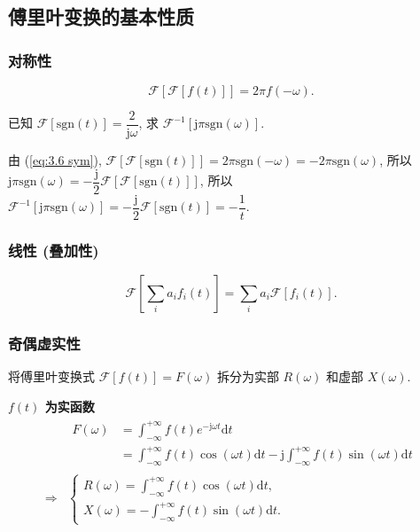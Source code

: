 \subsection{傅里叶变换的基本性质} \label{3 傅里叶变换的基本性质}
\subsubsection{对称性}
\rmg
\begin{equation} \label{eq:3.6 sym}
    \mathcal{F}[\mathcal{F}[f(t)]]=2\pi f(-\omega).
\end{equation}

\begin{exampleprob}
    已知 $\mathcal{F}[\mathrm{sgn}(t)]=\dfrac{2}{\mathrm{j}\omega}$, 求 $\mathcal{F}^{-1}[\mathrm{j}\pi\mathrm{sgn}(\omega)]$.

    \begin{solution}
        由 (\ref{eq:3.6 sym}), $\mathcal{F}[\mathcal{F}[\mathrm{sgn}(t)]]=2\pi\mathrm{sgn}(-\omega)=-2\pi\mathrm{sgn}(\omega)$, 所以 $\mathrm{j}\pi\mathrm{sgn}(\omega)=-\dfrac{\mathrm{j}}{2}\mathcal{F}[\mathcal{F}[\mathrm{sgn}(t)]]$, 所以\newline $\mathcal{F}^{-1}[\mathrm{j}\pi\mathrm{sgn}(\omega)]=-\dfrac{\mathrm{j}}{2}\mathcal{F}[\mathrm{sgn}(t)]=-\dfrac{1}{t}$.
    \end{solution}
\end{exampleprob}

\subsubsection{线性 (叠加性)}
\srmg
\begin{equation}
    \mathcal{F}\left[\sum_{i}a_if_i(t)\right]=\sum_{i}a_i\mathcal{F}[f_i(t)].
\end{equation}

\subsubsection{奇偶虚实性}
将傅里叶变换式 $\mathcal{F}[f(t)]=F(\omega)$ 拆分为实部 $R(\omega)$ 和虚部 $X(\omega)$.

\textbf{$f(t)$ 为实函数}
\begin{align}
    \nonumber   & \begin{aligned}
                      F(\omega) & =\int_{-\infty}^{+\infty}f(t)e^{-\mathrm{j}\omega t}\mathrm{d}t                                                        \\
                                & =\int_{-\infty}^{+\infty}f(t)\cos(\omega t)\mathrm{d}t-\mathrm{j}\int_{-\infty}^{+\infty}f(t)\sin(\omega t)\mathrm{d}t
                  \end{aligned} \\
    \Rightarrow & \begin{cases}
                      R(\omega)=\int_{-\infty}^{+\infty}f(t)\cos(\omega t)\mathrm{d}t, \\
                      X(\omega)=-\int_{-\infty}^{+\infty}f(t)\sin(\omega t)\mathrm{d}t.
                  \end{cases}
\end{align}

